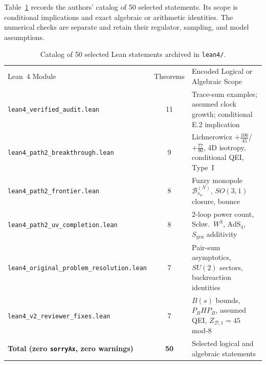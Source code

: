 \documentclass[onecolumn,11pt,aps,prd,amsmath,amssymb,nofootinbib,floatfix]{revtex4-2}
\newcommand{\scrD}{\mathscr{D}}
\newcommand{\calB}{\mathcal{B}}
\begin{document}
Table~\ref{tab:lean} records the authors' catalog of 50 selected statements. Its scope is conditional implications and exact algebraic or arithmetic identities. The numerical checks are separate and retain their regulator, sampling, and model assumptions.

\begin{table}[t]
\caption{Catalog of 50 selected Lean statements archived in \texttt{lean4/}.}
\label{tab:lean}
\begin{ruledtabular}
\begin{tabular}{p{}cp{}}
Lean~4 Module & Theorems & Encoded Logical or Algebraic Scope \\
\colrule
{\footnotesize\texttt{lean4\_verified\_audit.lean}} & 11 & Trace-sum examples; assumed clock growth; conditional E.2 implication \\
{\footnotesize\texttt{lean4\_path2\_breakthrough.lean}} & 9 & Lichnerowicz $+\frac{106}{45}$/$+\frac{77}{90}$, 4D isotropy, conditional QEI, Type~I \\
{\footnotesize\texttt{lean4\_path2\_frontier.lean}} & 8 & Fuzzy monopole $\calB_{s_w}^{(N)}$, $SO(3,1)$ closure, bounce \\
{\footnotesize\texttt{lean4\_path2\_uv\_completion.lean}} & 8 & 2-loop power count, Schw.\ $W^3$, $\mathrm{AdS}_4$, $S_{\mathrm{gen}}$ additivity \\
{\footnotesize\texttt{lean4\_original\_problem\_resolution.lean}} & 7 & Pair-sum asymptotics, $SU(2)$ sectors, backreaction identities \\
{\footnotesize\texttt{lean4\_v2\_reviewer\_fixes.lean}} & 7 & $B(s)$ bounds, $P_B H P_B$, assumed QEI, $Z_{\scrD,1}=45$ mod-8 \\
\colrule
\textbf{Total (zero \texttt{sorryAx}, zero warnings)} & \textbf{50} & Selected logical and algebraic statements \\
\end{tabular}
\end{ruledtabular}
\end{table}


\end{document}
